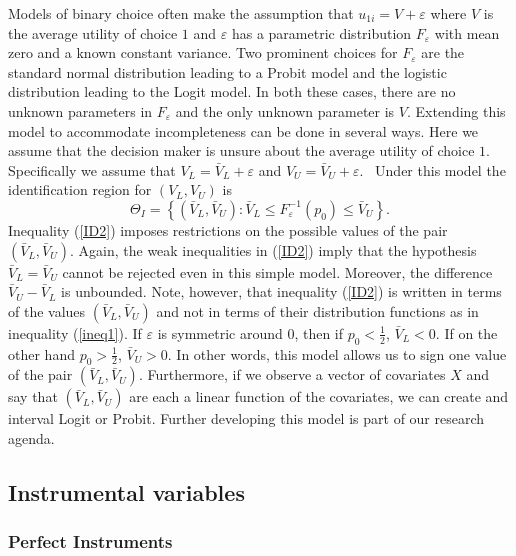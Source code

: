\documentclass[reqno]{article}
\begin{document}
Models of binary choice often make the assumption that $u_{1i}=V+\varepsilon 
$ where $V$ is the average utility of choice $1$ and $\varepsilon $ has a
parametric distribution $F_{\varepsilon }$ with mean zero and a known
constant variance. Two prominent choices for $F_{\varepsilon }$ are the
standard normal distribution leading to a Probit model and the logistic
distribution leading to the Logit model. In both these cases, there are no
unknown parameters in $F_{\varepsilon }$ and the only unknown parameter is $%
V $. Extending this model to accommodate incompleteness can be done in
several ways. Here we assume that the decision maker is unsure about the
average utility of choice $1$. Specifically we assume that $V_{L}=\bar{V}%
_{L}+\varepsilon $ and $V_{U}=\bar{V}_{U}+\varepsilon $. \ Under this model
the identification region for $\left( V_{L},V_{U}\right) $ is 
\begin{equation}
\Theta _{I}=\left\{ \left( \bar{V}_{L},\bar{V}_{U}\right) :\bar{V}_{L}\leq
F_{\varepsilon }^{-1}(p_{0})\leq \bar{V}_{U}\right\} .  \label{ID2}
\end{equation}%
Inequality (\ref{ID2}) imposes restrictions on the possible values of the
pair $\left( \bar{V}_{L},\bar{V}_{U}\right) $. Again, the weak inequalities
in (\ref{ID2}) imply that the hypothesis $\bar{V}_{L}=\bar{V}_{U}$ cannot be
rejected even in this simple model. Moreover, the difference $\bar{V}_{U}-%
\bar{V}_{L}$ is unbounded. Note, however, that inequality (\ref{ID2}) is
written in terms of the values $\left( \bar{V}_{L},\bar{V}_{U}\right) $ and
not in terms of their distribution functions as in inequality (\ref{ineq1}).
If $\varepsilon $ is symmetric around $0$, then if $p_{0}<\frac{1}{2}$, $%
\bar{V}_{L}<0$. If on the other hand $p_{0}>\frac{1}{2}$, $\bar{V}_{U}>0$.
In other words, this model allows us to sign one value of the pair $\left( 
\bar{V}_{L},\bar{V}_{U}\right) $. Furthermore, if we observe a vector of
covariates $X$ and say that $\left( \bar{V}_{L},\bar{V}_{U}\right) $ are
each a linear function of the covariates, we can create and interval Logit
or Probit. Further developing this model is part of our research agenda.

\subsection{Instrumental variables}

\subsubsection{Perfect Instruments}
\end{document}
